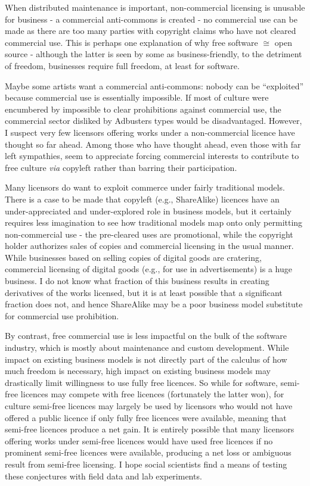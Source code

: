 When distributed maintenance is important, non-commercial licensing is unusable
for business - a commercial anti-commons is created - no commercial use can be
made as there are too many parties with copyright claims who have not cleared
commercial use. This is perhaps one explanation of why free software $\cong$
open source - although the latter is seen by some as business-friendly, to the
detriment of freedom, businesses require full freedom, at least for software.

Maybe some artists want a commercial anti-commons: nobody can be ``exploited''
because commercial use is essentially impossible. If most of culture were
encumbered by impossible to clear prohibitions against commercial use, the
commercial sector disliked by Adbusters types would be disadvantaged. However, I
suspect very few licensors of\hbox{}fering works under a non-commercial licence
have thought so far ahead. Among those who have thought ahead, even those with
far left sympathies, seem to appreciate forcing commercial interests to
contribute to free culture \textit{via} copyleft rather than barring their
participation.

Many licensors do want to exploit commerce under fairly traditional models.
There is a case to be made that copyleft (e.g., ShareAlike) licences have an
under-appreciated and under-explored role in business models, but it certainly
requires less imagination to see how traditional models map onto only permitting
non-commercial use - the pre-cleared uses are promotional, while the copyright
holder authorizes sales of copies and commercial licensing in the usual manner.
While businesses based on selling copies of digital goods are cratering,
commercial licensing of digital goods (e.g., for use in advertisements) is a
huge business. I do not know what fraction of this business results in creating
derivatives of the works licensed, but it is at least possible that a
signif\hbox{}icant fraction does not, and hence ShareAlike may be a poor
business model substitute for commercial use prohibition.

By contrast, free commercial use is less impactful on the bulk of the software
industry, which is mostly about maintenance and custom development. While impact
on existing business models is not directly part of the calculus of how much
freedom is necessary, high impact on existing business models may drastically
limit willingness to use fully free licences. So while for software, semi-free
licences may compete with free licences (fortunately the latter won), for
culture semi-free licences may largely be used by licensors who would not have
of\hbox{}fered a public licence if only fully free licences were available,
meaning that semi-free licences produce a net gain. It is entirely possible that
many licensors of\hbox{}fering works under semi-free licences would have used
free licences if no prominent semi-free licences were available, producing a net
loss or ambiguous result from semi-free licensing. I hope social scientists
f\hbox{}ind a means of testing these conjectures with f\hbox{}ield data and lab
experiments.

